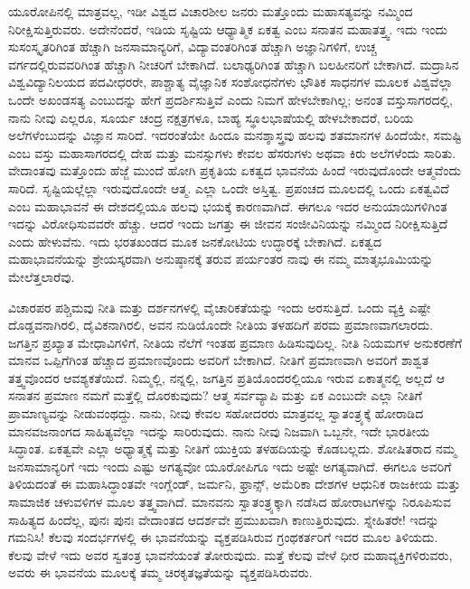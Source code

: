 ಯೂರೋಪಿನಲ್ಲಿ ಮಾತ್ರವಲ್ಲ, ಇಡೀ ವಿಶ್ವದ ವಿಚಾರಶೀಲ ಜನರು ಮತ್ತೊಂದು ಮಹಾಸತ್ಯವನ್ನು ನಮ್ಮಿಂದ ನಿರೀಕ್ಷಿಸುತ್ತಿರುವರು. ಅದೇನೆಂದರೆ, ಇಡಿಯ ಸೃಷ್ಟಿಯ ಆಧ್ಯಾತ್ಮಿಕ ಏಕತ್ವ ಎಂಬ ಸನಾತನ ಮಹಾತತ್ತ್ವ. ಇದು ಇಂದು ಸುಸಂಸ್ಕೃತರಿಗಿಂತ ಹೆಚ್ಚಾಗಿ ಜನಸಾಮಾನ್ಯರಿಗೆ, ವಿದ್ಯಾವಂತರಿಗಿಂತ ಹೆಚ್ಚಾಗಿ ಅಜ್ಞಾನಿಗಳಿಗೆ, ಉಚ್ಚ ವರ್ಗದಲ್ಲಿರುವವರಿಗಿಂತ ಹೆಚ್ಚಾಗಿ ನೀಚರಿಗೆ ಬೇಕಾಗಿದೆ. ಬಲಾಢ್ಯರಿಗಿಂತ ಹೆಚ್ಚಾಗಿ ಬಲಹೀನರಿಗೆ ಬೇಕಾಗಿದೆ. ಮದ್ರಾಸಿನ ವಿಶ್ವವಿದ್ಯಾನಿಲಯದ ಪದವೀಧರರೇ, ಪಾಶ್ಚಾತ್ಯ ವೈಜ್ಞಾನಿಕ ಸಂಶೋಧನೆಗಳು ಭೌತಿಕ ಸಾಧನಗಳ ಮೂಲಕ ವಿಶ್ವವೆಲ್ಲಾ ಒಂದೇ ಅಖಂಡಸತ್ಯ ಎಂಬುದನ್ನು ಹೇಗೆ ಪ್ರದರ್ಶಿಸುತ್ತಿವೆ ಎಂದು ನಿಮಗೆ ಹೇಳಬೇಕಾಗಿಲ್ಲ; ಅನಂತ ವಸ್ತುಸಾಗರದಲ್ಲಿ, ನಾನು ನೀವು ಎಲ್ಲರೂ, ಸೂರ್ಯ ಚಂದ್ರ ನಕ್ಷತ್ರಗಳೂ, ಬಾಹ್ಯ ಸ್ಥೂಲಭಾಷೆಯಲ್ಲಿ ಹೇಳಬೇಕಾದರೆ, ಬರಿಯ ಅಲೆಗಳೆಂಬುದನ್ನು ವಿಜ್ಞಾನ ಸಾರಿದೆ. ಇದರಂತೆಯೇ ಹಿಂದೂ ಮನಶ್ಶಾಸ್ತ್ರವು ಹಲವು ಶತಮಾನಗಳ ಹಿಂದೆಯೇ, ಸಮಷ್ಟಿ ಎಂಬ ವಸ್ತು ಮಹಾಸಾಗರದಲ್ಲಿ ದೇಹ ಮತ್ತು ಮನಸ್ಸುಗಳು ಕೇವಲ ಹೆಸರುಗಳು ಅಥವಾ ಕಿರು ಅಲೆಗಳೆಂದು ಸಾರಿತು. ವೇದಾಂತವು ಮತ್ತೊಂದು ಹೆಜ್ಜೆ ಮುಂದೆ ಹೋಗಿ ಪ್ರಕೃತಿಯ ಏಕತ್ವದ ಭಾವನೆಯ ಹಿಂದೆ ಇರುವುದೊಂದೇ ಆತ್ಮವೆಂದು ಸಾರಿದೆ. ಸೃಷ್ಟಿಯಲ್ಲೆಲ್ಲಾ ಇರುವುದೊಂದೇ ಆತ್ಮ. ಎಲ್ಲಾ ಒಂದೇ ಅಸ್ತಿತ್ವ. ಪ್ರಪಂಚದ ಮೂಲದಲ್ಲಿ ಒಂದು ಏಕತ್ವವಿದೆ ಎಂಬ ಮಹಾಭಾವನೆ ಈ ದೇಶದಲ್ಲಿಯೂ ಹಲವು ಭಯಕ್ಕೆ ಕಾರಣವಾಗಿದೆ. ಈಗಲೂ ಇದರ ಅನುಯಾಯಿಗಳಿಗಿಂತ ಇದನ್ನು ವಿರೋಧಿಸುವವರೇ ಹೆಚ್ಚು. ಆದರೆ ಇಂದು ಜಗತ್ತು ಈ ಜೀವನ ಸಂಜೀವಿನಿಯನ್ನು ನಮ್ಮಿಂದ ನಿರೀಕ್ಷಿಸುತ್ತಿದೆ ಎಂದು ಹೇಳುವೆನು. ಇದು ಭರತಖಂಡದ ಮೂಕ ಜನಕೋಟಿಯ ಉದ್ಧಾರಕ್ಕೆ ಬೇಕಾಗಿದೆ. ಏಕತ್ವದ ಮಹಾಭಾವನೆಯನ್ನು ಶ್ರೇಯಸ್ಕರವಾಗಿ ಅನುಷ್ಠಾನಕ್ಕೆ ತರುವ ಪರ್ಯಂತರ ನಾವು ಈ ನಮ್ಮ ಮಾತೃಭೂಮಿಯನ್ನು ಮೇಲೆತ್ತಲಾರೆವು. 

ವಿಚಾರಪರ ಪಶ್ಚಿಮವು ನೀತಿ ಮತ್ತು ದರ್ಶನಗಳಲ್ಲಿ ವೈಚಾರಿಕತೆಯನ್ನು ಇಂದು ಅರಸುತ್ತಿದೆ. ಒಂದು ವ್ಯಕ್ತಿ ಎಷ್ಟೇ ದೊಡ್ಡವನಾಗಿರಲಿ, ದೈವಿಕನಾಗಿರಲಿ, ಅವನ ನುಡಿಯೊಂದೇ ನೀತಿಯ ತಳಹದಿಗೆ ಪರಮ ಪ್ರಮಾಣವಾಗಲಾರದು. ಜಗತ್ತಿನ ಪ್ರಖ್ಯಾತ ಮೇಧಾವಿಗಳಿಗೆ, ನೀತಿಯ ನೆಲೆಗೆ ಇಂತಹ ಪ್ರಮಾಣ ಹಿಡಿಸುವುದಿಲ್ಲ. ನೀತಿ ನಿಯಮಗಳ ಅನುಕರಣೆಗೆ ಮಾನವ ಒಪ್ಪಿಗೆಗಿಂತ ಹೆಚ್ಚಾದ ಪ್ರಮಾಣವೊಂದು ಅವರಿಗೆ ಬೇಕಾಗಿದೆ. ನೀತಿಗೆ ಪ್ರಮಾಣವಾಗಿ ಅವರಿಗೆ ಶಾಶ್ವತ ತತ್ತ್ವವೊಂದರ ಆವಶ್ಯಕತೆಯಿದೆ. ನಿಮ್ಮಲ್ಲಿ, ನನ್ನಲ್ಲಿ, ಜಗತ್ತಿನ ಪ್ರತಿಯೊಂದರಲ್ಲಿಯೂ ಇರುವ ಏಕಾತ್ಮನಲ್ಲಿ ಅಲ್ಲದೆ ಆ ಸನಾತನ ಪ್ರಮಾಣ ನಮಗೆ ಮತ್ತೆಲ್ಲಿ ದೊರಕುವುದು? ಆತ್ಮ ಸರ್ವವ್ಯಾಪಿ ಮತ್ತು ಏಕ ಎಂಬುದೇ ಎಲ್ಲಾ ನೀತಿಗೆ ಪ್ರಾಮಾಣ್ಯವನ್ನು ನೀಡುವಂಥದ್ದು. ನಾನು, ನೀವು ಕೇವಲ ಸಹೋದರರು ಮಾತ್ರವಲ್ಲ ಸ್ವಾತಂತ್ರ್ಯಕ್ಕೆ ಹೋರಾಡಿದ ಮಾನವಜನಾಂಗದ ಸಾಹಿತ್ಯವೆಲ್ಲಾ ಇದನ್ನು ಸಾರಿರುವುದು. ನಾನು ನೀವು ನಿಜವಾಗಿ ಒಬ್ಬನೇ, ಇದೇ ಭಾರತೀಯ ಸಿದ್ಧಾಂತ. ಏಕತ್ವವೇ ಎಲ್ಲಾ ಅಧ್ಯಾತ್ಮಕ್ಕೆ ಮತ್ತು ನೀತಿಗೆ ಯುಕ್ತಿಯ ತಳಹದಿಯನ್ನು ಕೊಡಬಲ್ಲದು. ಶೋಷಿತರಾದ ನಮ್ಮ ಜನಸಾಮಾನ್ಯರಿಗೆ ಇದು ಇಂದು ಎಷ್ಟು ಅಗತ್ಯವೋ ಯೂರೋಪಿಗೂ ಇದು ಅಷ್ಟೇ ಅಗತ್ಯವಾಗಿದೆ. ಈಗಲೂ ಅವರಿಗೆ ತಿಳಿಯದಂತೆ ಈ ಮಹಾಸಿದ್ಧಾಂತವೇ ಇಂಗ್ಲೆಂಡ್​, ಜರ್ಮನಿ, ಫ್ರಾನ್ಸ್, ಅಮೆರಿಕಾ ದೇಶಗಳ ಆಧುನಿಕ ರಾಜಕೀಯ ಮತ್ತು ಸಾಮಾಜಿಕ ಚಳುವಳಿಗಳ ಮೂಲ ತತ್ತ್ವವಾಗಿದೆ. ಮಾನವನು ಸ್ವಾತಂತ್ರ್ಯಕ್ಕಾಗಿ ನಡೆಸಿದ ಹೋರಾಟಗಳನ್ನು ನಿರೂಪಿಸುವ ಸಾಹಿತ್ಯದ ಹಿಂದೆಲ್ಲ, ಪುನಃ ಪುನಃ ವೇದಾಂತದ ಆದರ್ಶವೇ ಪ್ರಮುಖವಾಗಿ ಕಾಣುತ್ತಿರುವುದು. ಸ್ನೇಹಿತರೇ! ಇದನ್ನು ಗಮನಿಸಿ! ಕೆಲವು ಸಂದರ್ಭಗಳಲ್ಲಿ ಈ ಭಾವನೆಯನ್ನು ವ್ಯಕ್ತಪಡಿಸಿರುವ ಗ್ರಂಥಕರ್ತರಿಗೆ ಇದರ ಮೂಲ ತಿಳಿಯದು. ಕೆಲವು ವೇಳೆ ಇದು ಅವರ ಸ್ವತಂತ್ರ ಭಾವನೆಯಂತೆ ತೋರುವುದು. ಮತ್ತೆ ಕೆಲವು ವೇಳೆ ಧೀರ ಮಹಾವ್ಯಕ್ತಿಗಳಿರುವರು, ಅವರು ಈ ಭಾವನೆಯ ಮೂಲಕ್ಕೆ ತಮ್ಮ ಚಿರಕೃತಜ್ಞತೆಯನ್ನು ವ್ಯಕ್ತಪಡಿಸಿರುವರು. 

